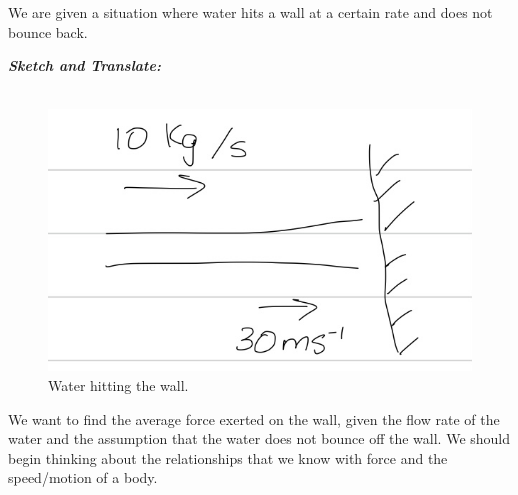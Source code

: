 %
%


\begin{subquestions}

\subquestion
We are given a situation where water hits a wall at a certain rate and does not bounce back.

\textbf{\textit{Sketch and Translate:}} \\ \\
\begin{figure}[H]
	\begin{center}
		\includegraphics[scale=0.25]{../2015/figures/2015q6-1}
		\caption{\label{2015:q6:fig:Sketch1} Water hitting the wall.}
	\end{center}
\end{figure}
We want to find the average force exerted on the wall, given the flow rate of the water and the assumption that the water does not bounce off the wall. We should begin thinking about the relationships that we know with force and the speed/motion of a body.





\end{subquestions}
